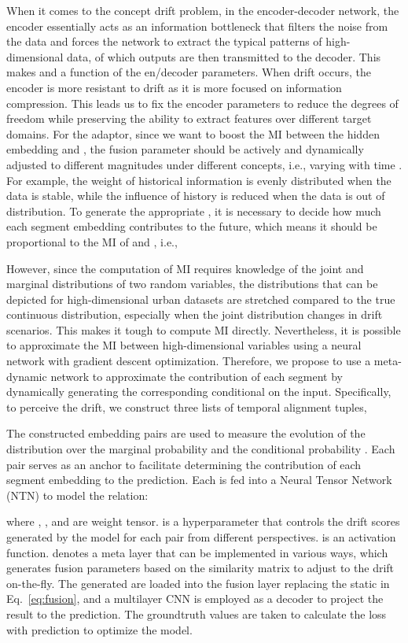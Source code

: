 \documentclass[sigconf]{acmart}
\begin{document}
When it comes to the concept drift problem, in the encoder-decoder network, the encoder essentially acts as an information bottleneck that filters the noise from the data and forces the network to extract the typical patterns of high-dimensional data, of which outputs are then transmitted to the decoder. This makes  and  a function of the en/decoder parameters. When drift occurs, the encoder is more resistant to drift as it is more focused on information compression. This leads us to fix the encoder parameters  to reduce the degrees of freedom while preserving the ability to extract features over different target domains. For the adaptor, since we want to boost the MI between the hidden embedding  and , the fusion parameter  should be actively and dynamically adjusted to different magnitudes under different concepts, i.e., varying with time . For example, the weight of historical information is evenly distributed when the data is stable, while the influence of history is reduced when the data is out of distribution. To generate the appropriate , it is necessary to decide how much each segment embedding contributes to the future, which means it should be proportional to the MI of  and , i.e.,


However, since the computation of MI requires knowledge of the joint and marginal distributions of two random variables, the distributions that can be depicted for high-dimensional urban datasets are stretched compared to the true continuous distribution, especially when the joint distribution changes in drift scenarios. This makes it tough to compute MI directly. Nevertheless, it is possible to approximate the MI between high-dimensional variables using a neural network with gradient descent optimization\cite{belghazi2018mine}. Therefore, we propose to use a meta-dynamic network to approximate the contribution of each segment by dynamically generating the corresponding  conditional on the input. Specifically, to perceive the drift, we construct three lists of temporal alignment tuples,

The constructed embedding pairs are used to measure the evolution of the distribution over the marginal probability  and the conditional probability . Each pair serves as an anchor to facilitate determining the contribution of each segment embedding to the prediction. Each  is fed into a Neural Tensor Network (NTN) \cite{socher2013reasoning} to model the relation:

where , , and  are weight tensor.  is a hyperparameter that controls the drift scores generated by the model for each pair from different perspectives.  is an activation function.  denotes a meta layer that can be implemented in various ways, which generates fusion parameters based on the similarity matrix to adjust to the drift on-the-fly. The generated  are loaded into the fusion layer replacing the static  in Eq.~\ref{eq:fusion}, and a multilayer CNN is employed as a decoder to project the result to the prediction. The groundtruth values are taken to calculate the loss with prediction to optimize the model. 
\end{document}
